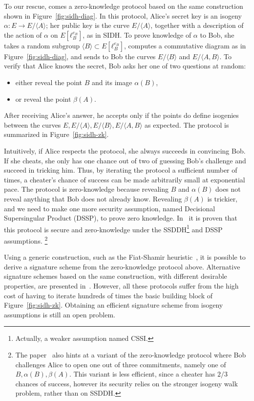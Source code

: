 \documentclass[10pt]{article}
\theoremstyle{plain}
\theoremstyle{definition}
\begin{document}
To our rescue, comes a zero-knowledge protocol based on the same
construction shown in Figure~\ref{fig:sidh-diag}. %
In this protocol, Alice's secret key is an isogeny $α:E\to E/〈A〉$;
her public key is the curve $E/〈A〉$, together with a description of
the action of $α$ on $E[ℓ_B^{e_B}]$, as in SIDH. %
To prove knowledge of $α$ to Bob, she takes a random subgroup
$〈B〉⊂E[ℓ_B^{e_B}]$, computes a commutative diagram as in
Figure~\ref{fig:sidh-diag}, and sends to Bob the curves $E/〈B〉$ and
$E/〈A,B〉$. %
To verify that Alice knows the secret, Bob asks her one of two
questions at random:
\begin{itemize}
\item either reveal the point $B$ and its image $α(B)$,
\item or reveal the point $β(A)$.
\end{itemize}
After receiving Alice's answer, he accepts only if the points do
define isogenies between the curves $E,E/〈A〉,E/〈B〉,E/〈A,B〉$ as
expected. %
The protocol is summarized in Figure~\ref{fig:sidh-zk}.

Intuitively, if Alice respects the protocol, she always succeeds in
convincing Bob. %
If she cheats, she only has one chance out of two of guessing Bob's
challenge and succeed in tricking him. %
Thus, by iterating the protocol a sufficient number of times, a
cheater's chance of success can be made arbitrarily small at
exponential pace. %
The protocol is zero-knowledge because revealing $B$ and $α(B)$ does
not reveal anything that Bob does not already know. %
Revealing $β(A)$ is trickier, and we need to make one more security
assumption, named Decisional Supersingular Product (DSSP), to prove
zero knowledge. %
In~\cite{defeo+jao+plut12} it is proven that this protocol is secure
and zero-knowledge under the SSDDH\footnote{Actually, a weaker
  assumption named CSSI.} and DSSP assumptions.%
\footnote{The paper~\cite{defeo+jao+plut12} also hints at a variant of
  the zero-knowledge protocol where Bob challenges Alice to open one
  out of three commitments, namely one of $Β,α(B),β(A)$. %
  This variant is less efficient, since a cheater has $2/3$ chances of
  success, however its security relies on the stronger isogeny walk
  problem, rather than on SSDDH.}

Using a generic construction, such as the Fiat-Shamir
heuristic~\cite{fiat1986prove}, it is possible to derive a signature
scheme from the zero-knowledge protocol above. %
Alternative signature schemes based on the same construction, with
different desirable properties, are presented
in~\cite{cryptoeprint:2016:1154,cryptoeprint:2017:186}. %
However, all these protocols suffer from the high cost of having to
iterate hundreds of times the basic building block of
Figure~\ref{fig:sidh-zk}. %
Obtaining an efficient signature scheme from isogeny assumptions is
still an open problem.
\end{document}
